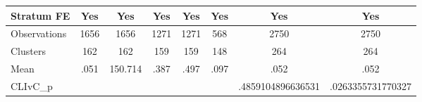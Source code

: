 {\begin{tabular}{l*{7}{c}}
Stratum FE      &      Yes         &      Yes         &      Yes         &      Yes         &      Yes         &      Yes         &      Yes         \\
\hline
Observations    &     1656         &     1656         &     1271         &     1271         &      568         &     2750         &     2750         \\
Clusters        &      162         &      162         &      159         &      159         &      148         &      264         &      264         \\
Mean            &     .051         &  150.714         &     .387         &     .497         &     .097         &     .052         &     .052         \\
CLIvC\_p         &                  &                  &                  &                  &                  &.4859104896636531         &.0263355731770327         \\
\hline\hline
\end{tabular}
}
